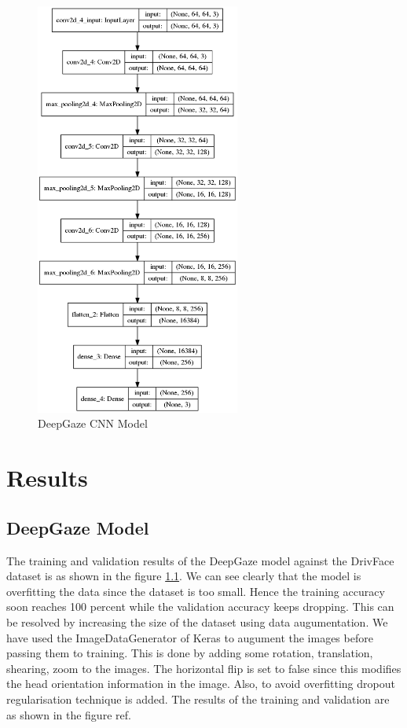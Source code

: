 \documentclass[a4paper, 12pt, oneside, BCOR1cm,toc=chapterentrywithdots]{scrbook}
\begin{document}
\begin{figure}[h]
\centering
\includegraphics[width=0.6\textwidth]{model_plot_DeepGaze.png}
\caption{DeepGaze CNN Model}
\label{fig:pic8}
\end{figure}


\section{Results}

\subsection{DeepGaze Model}

The training and validation results of the DeepGaze model against the DrivFace dataset is as shown in the figure \ref{}. We can see clearly that the model is overfitting the data since the dataset is too small. Hence the training accuracy soon reaches 100 percent while the validation accuracy keeps dropping. This can be resolved by increasing the size of the dataset using data augumentation. We have used the ImageDataGenerator of Keras \cite{} to augument the images before passing them to training. This is done by adding some rotation, translation, shearing, zoom to the images. The horizontal flip is set to false since this modifies the head orientation information in the image. Also, to avoid overfitting dropout regularisation \cite{} technique is added. The results of the training and validation are as shown in the figure ref{}.
\end{document}
